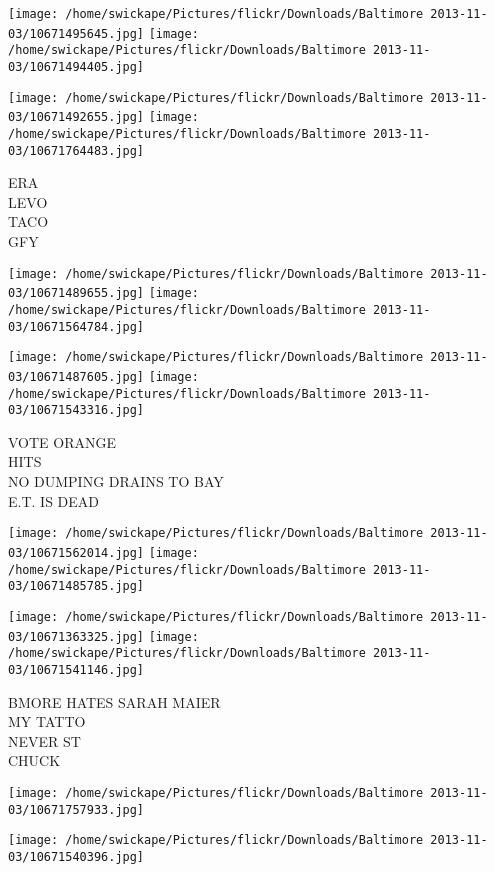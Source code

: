 \documentclass[10pt,letterpaper]{article}
\begin{document}
\texttt{[image: /home/swickape/Pictures/flickr/Downloads/Baltimore 2013-11-03/10671495645.jpg]}
\texttt{[image: /home/swickape/Pictures/flickr/Downloads/Baltimore 2013-11-03/10671494405.jpg]}

\texttt{[image: /home/swickape/Pictures/flickr/Downloads/Baltimore 2013-11-03/10671492655.jpg]}
\texttt{[image: /home/swickape/Pictures/flickr/Downloads/Baltimore 2013-11-03/10671764483.jpg]}

ERA\\
LEVO\\
TACO\\
GFY\\
\pagebreak

\texttt{[image: /home/swickape/Pictures/flickr/Downloads/Baltimore 2013-11-03/10671489655.jpg]}
\texttt{[image: /home/swickape/Pictures/flickr/Downloads/Baltimore 2013-11-03/10671564784.jpg]}

\texttt{[image: /home/swickape/Pictures/flickr/Downloads/Baltimore 2013-11-03/10671487605.jpg]}
\texttt{[image: /home/swickape/Pictures/flickr/Downloads/Baltimore 2013-11-03/10671543316.jpg]}

VOTE ORANGE\\
HITS\\
NO DUMPING DRAINS TO BAY\\
E.T. IS DEAD\\
\pagebreak

\texttt{[image: /home/swickape/Pictures/flickr/Downloads/Baltimore 2013-11-03/10671562014.jpg]}
\texttt{[image: /home/swickape/Pictures/flickr/Downloads/Baltimore 2013-11-03/10671485785.jpg]}

\texttt{[image: /home/swickape/Pictures/flickr/Downloads/Baltimore 2013-11-03/10671363325.jpg]}
\texttt{[image: /home/swickape/Pictures/flickr/Downloads/Baltimore 2013-11-03/10671541146.jpg]}

BMORE HATES SARAH MAIER\\
MY TATTO\\
NEVER ST\\
CHUCK\\
\pagebreak

\texttt{[image: /home/swickape/Pictures/flickr/Downloads/Baltimore 2013-11-03/10671757933.jpg]}

\vspace{0.25in}
\texttt{[image: /home/swickape/Pictures/flickr/Downloads/Baltimore 2013-11-03/10671540396.jpg]}
\end{document}
